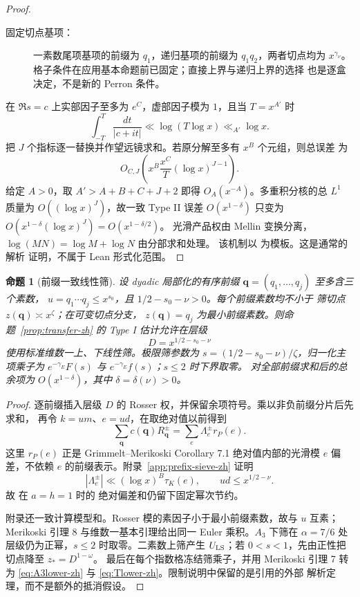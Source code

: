 \documentclass[UTF8,10pt,a4paper]{ctexart}
\newcommand{\1}{\mathbf{1}}
\newtheorem{proposition}[theorem]{命题}
\theoremstyle{remark}
\begin{document}
\begin{proof}
\begin{description}
\item[固定切点基项：]
一素数尾项基项的前缀为 $q_1$，递归基项的前缀为 $q_1q_2$，两者切点均为
$x^{\gamma_\nu}$。格子条件在应用基本命题前已固定；直接上界与递归上界的选择
也是逐盒决定，不是新的 Perron 条件。
\end{description}

在 $\Re s=c$ 上实部因子至多为 $e^C$，虚部因子模为 $1$，且当
$T=x^{A'}$ 时
\[
 \int_{-T}^{T}\frac{dt}{|c+it|}
 \ll\log(T\log x)\ll_{A'}\log x.
\]
把 $J$ 个指标逐一替换并作望远镜求和。若原分解至多有 $x^B$ 个元组，则总误差
为
\[
 O_{C,J}\!\left(x^B\frac{x^C}{T}(\log x)^{J-1}\right).
\]
给定 $A>0$，取 $A'>A+B+C+J+2$ 即得 $O_A(x^{-A})$。多重积分核的总
$L^1$ 质量为 $O((\log x)^J)$，故一致 Type II 误差
$O(x^{1-\delta})$ 只变为 $O(x^{1-\delta}(\log x)^J)
=O(x^{1-\delta/2})$。
光滑产品权由 Mellin 变换分离，$\log(MN)=\log M+\log N$ 由分部求和处理。
该机制以 \cite[Sections 2.3 and 3.4]{Merikoski2020} 为模板。这是通常的解析
证明，不属于 Lean 形式化范围。
\end{proof}

\begin{proposition}[前缀一致线性筛]\label{prop:prefix-sieve-zh}
设 dyadic 局部化的有序前缀 $\boldsymbol q=(q_1,\ldots,q_j)$ 至多含三个素数，
$u=q_1\cdots q_j\le x^{s_0}$，且 $1/2-s_0-\nu>0$。每个前缀素数均不小于
筛切点 $z(\boldsymbol q)\asymp x^\zeta$；在可变切点分支，
$z(\boldsymbol q)=q_j$ 为最小前缀素数。则命题~\ref{prop:transfer-zh} 的
Type I 估计允许在层级
\[
 D=x^{1/2-s_0-\nu}
\]
使用标准维数一上、下线性筛。极限筛参数为
$s=(1/2-s_0-\nu)/\zeta$，归一化主项乘子为
$e^{-\gamma_E}F(s)$ 与 $e^{-\gamma_E}f(s)$；$s\le2$ 时下界取零。
对全部前缀求和后的总余项为 $O(x^{1-\delta})$，其中
$\delta=\delta(\nu)>0$。
\end{proposition}

\begin{proof}
逐前缀插入层级 $D$ 的 Rosser 权，并保留余项符号。乘以非负前缀分片后先求和，
再令 $k=um$、$e=ud$，在取绝对值以前得到
\[
 \sum_{\boldsymbol q}c(\boldsymbol q)R_{\boldsymbol q}^{\pm}
 =\sum_e\Lambda_e^\pm r_P(e).
\]
这里 $r_P(e)$ 正是 Grimmelt--Merikoski Corollary 7.1 绝对值内部的光滑模
$e$ 偏差，不依赖 $e$ 的前缀表示。附录~\ref{app:prefix-sieve-zh} 证明
\[
 |\Lambda_e^\pm|\ll(\log x)^B\tau_K(e),\qquad ud\le x^{1/2-\nu}.
\]
故 \cite[Corollary 7.1, p. 22]{GrimmeltMerikoski2025} 在 $a=h=1$ 时的
绝对偏差和仍留下固定幂次节约。

附录还一致计算模型和。Rosser 模的素因子小于最小前缀素数，故与 $u$ 互素；
Merikoski 引理 8 与维数一基本引理给出同一 Euler 乘积。$A_3$ 下筛在
$\alpha=7/6$ 处层级仍为正幂，$s\le2$ 时取零。二素数上筛产生
$U_{\rm LS}$；若 $0<s<1$，先由正性把切点降至 $z_*=D^{1-\omega}$。
最后在每个指数格冻结筛乘子，并用 Merikoski 引理 7 转为
\eqref{eq:A3lower-zh} 与 \eqref{eq:Tlower-zh}。限制说明中保留的是引用的外部
解析定理，而不是额外的抵消假设。
\end{proof}
\end{document}
